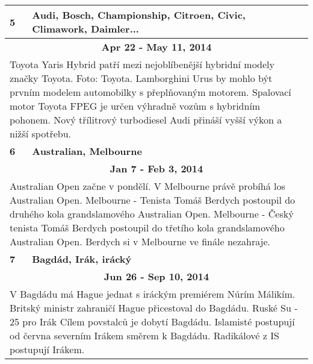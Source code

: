 \begin{tabularx}{\linewidth}{l l}
\bf 5 & \bf Audi, Bosch, Championship, Citroen, Civic, Climawork, Daimler... \\ \midrule
\multicolumn{2}{c}{\bf Apr 22 - May 11, 2014} \\
\multicolumn{2}{p{\linewidth}}{Toyota Yaris Hybrid patří mezi nejoblíbenější hybridní modely značky Toyota. Foto: Toyota. Lamborghini Urus by mohlo být prvním modelem automobilky s přeplňovaným motorem. Spalovací motor Toyota FPEG je určen výhradně vozům s hybridním pohonem. Nový třílitrový turbodiesel Audi přináší vyšší výkon a nižší spotřebu.} \\ \midrule[1.5pt]

\bf 6 & \bf Australian, Melbourne \\ \midrule
\multicolumn{2}{c}{\bf Jan 7 - Feb 3, 2014} \\
\multicolumn{2}{p{\linewidth}}{Australian Open začne v pondělí. V Melbourne právě probíhá los Australian Open. Melbourne - Tenista Tomáš Berdych postoupil do druhého kola grandslamového Australian Open. Melbourne - Český tenista Tomáš Berdych postoupil do třetího kola grandslamového Australian Open. Berdych si v Melbourne ve finále nezahraje.} \\ \midrule[1.5pt]

\bf 7 & \bf Bagdád, Irák, irácký \\ \midrule
\multicolumn{2}{c}{\bf Jun 26 - Sep 10, 2014} \\
\multicolumn{2}{p{\linewidth}}{V Bagdádu má Hague jednat s iráckým premiérem Núrím Málikím. Britský ministr zahraničí Hague přicestoval do Bagdádu. Ruské Su - 25 pro Irák Cílem povstalců je dobytí Bagdádu. Islamisté postupují od června severním Irákem směrem k Bagdádu. Radikálové z IS postupují Irákem.} \\ \midrule[1.5pt]


\end{tabularx}
